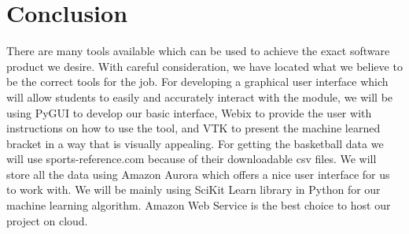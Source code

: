 \documentclass[journal,onecolumn]{IEEEtran}
\begin{document}




\section{Conclusion}
There are many tools available which can be used to achieve the exact software product we desire. With careful consideration, we have located what we believe to be the correct tools for the job. For developing a graphical user interface which will allow students to easily and accurately interact with the module, we will be using PyGUI to develop our basic interface, Webix to provide the user with instructions on how to use the tool, and VTK to present the machine learned bracket in a way that is visually appealing. For getting the basketball data we will use sports-reference.com because of their downloadable csv files. We will store all the data using Amazon Aurora which offers a nice user interface for us to work with. We will be mainly using SciKit Learn library in Python for our machine learning algorithm. Amazon Web Service is the best choice to host our project on cloud. 






%
\end{document}
